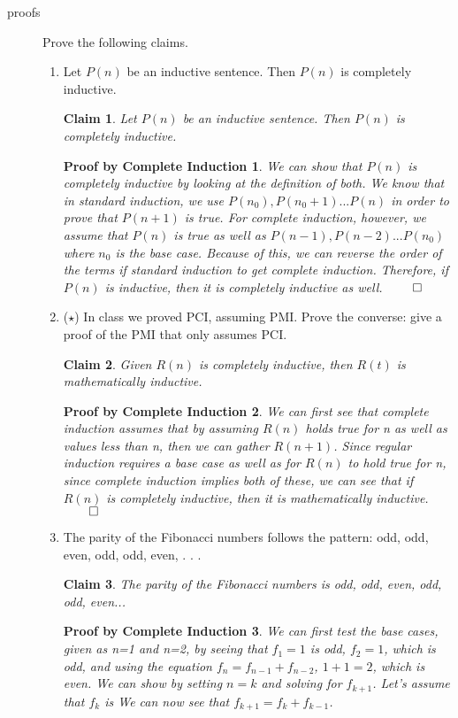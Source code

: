 \documentclass[10pt]{letter}
\newtheorem{PBCI}{Proof by Complete Induction}
\newtheorem{claim}{Claim}
\theoremstyle{definition}
\begin{document}
\begin{description}
	\item[proofs] Prove the following claims. 
	\begin{enumerate}
			\item Let $P(n)$ be an inductive sentence. Then $P(n)$ is completely inductive.
\begin{claim}
Let $P(n)$ be an inductive sentence. Then $P(n)$ is completely inductive. 
\end{claim}
\begin{PBCI}
We can show that $P(n)$ is completely inductive by looking at the definition of both. We know that in standard induction, we use $P(n_0),P(n_0+1)...P(n)$ in order to prove that $P(n+1)$ is true. For complete induction, however, we assume that $P(n)$ is true as well as $P(n-1),P(n-2)...P(n_0)$ where $n_0$ is the base case. Because of this, we can reverse the order of the terms if standard induction to get complete induction. Therefore, if $P(n)$ is inductive, then it is completely inductive as well. $\qed$
\end{PBCI}
			\item ($\star$) In class we proved PCI, assuming PMI. Prove the converse: give a proof of the PMI that only assumes PCI.
\begin{claim} Given $R(n)$ is completely inductive, then $R(t)$ is mathematically inductive.
\end{claim}
\begin{PBCI}
We can first see that complete induction assumes that by assuming  $R(n)$ holds true for n as well as values less than n, then we can gather $R(n+1)$. Since regular induction requires a base case as well as for $R(n)$ to hold true for n, since complete induction implies both of these, we can see that if $R(n)$ is completely inductive, then it is mathematically inductive.$\qed$
\end{PBCI}
		\item The parity of the Fibonacci numbers follows the pattern: odd, odd, even, odd, odd, even, . . .
\begin{claim}
The parity of the Fibonacci numbers is odd, odd, even, odd, odd, even...
\end{claim}
\begin{PBCI}
We can first test the base cases, given as n=1 and n=2, by seeing that $f_1=1$ is odd, $f_2=1$, which is odd, and using the equation $f_n=f_{n-1}+f_{n-2}$, $1+1=2$, which is even. We can show by setting $n=k$ and solving for $f_{k+1}$. Let's assume that $f_k$ is We can now see that $f_{k+1}=f_k+f_{k-1}$.  


\end{PBCI}
\end{enumerate}
\end{description}
\end{document}
